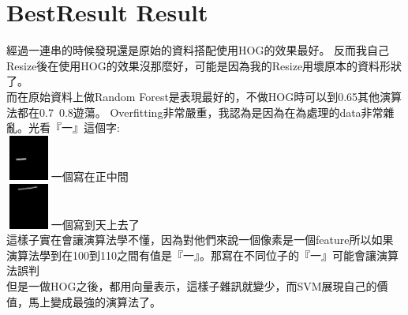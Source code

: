 \documentclass[12pt]{article}
\theoremstyle{definition}
\theoremstyle{remark}
\begin{document}
\section{BestResult Result}
經過一連串的時候發現還是原始的資料搭配使用HOG的效果最好。
反而我自己Resize後在使用HOG的效果沒那麼好，可能是因為我的Resize用壞原本的資料形狀了。\\
而在原始資料上做Random Forest是表現最好的，不做HOG時可以到0.65其他演算法都在0.7~0.8遊蕩。
Overfitting非常嚴重，我認為是因為在為處理的data非常雜亂。光看『一』這個字:\\
\includegraphics[width=1.5cm, height=1.5cm]{./photo44.jpg}一個寫在正中間\\
\includegraphics[width=1.5cm, height=1.5cm]{./photo228.jpg}一個寫到天上去了\\
這樣子實在會讓演算法學不懂，因為對他們來說一個像素是一個feature所以如果演算法學到在100到110之間有值是『一』。那寫在不同位子的『一』可能會讓演算法誤判\\
但是一做HOG之後，都用向量表示，這樣子雜訊就變少，而SVM展現自己的價值，馬上變成最強的演算法了。
\end{document}
